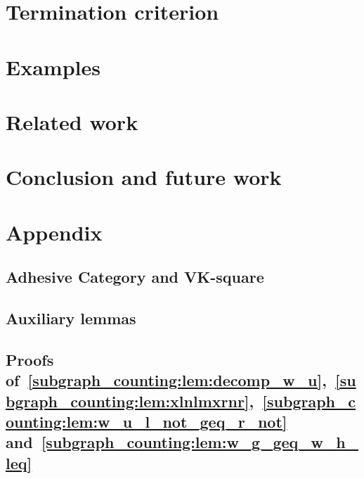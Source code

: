 \documentclass{report}
\begin{document}
 
  
\section{Termination criterion}
\label{subgraph_counting:sec:termination} 

 

\section{Examples} 
\label{subgraph_counting:sec:examples}


  
\section{Related work}
\label{subgraph_counting:sec:related_work} 


\section{Conclusion and future work}
\label{subgraph_counting:sec:conclusion} 


\section{Appendix}
\subsection*{Adhesive Category and VK-square}

\subsection*{Auxiliary lemmas}

\subsection*{Proofs of~\autoref{subgraph_counting:lem:decomp_w_u},~\autoref{subgraph_counting:lem:xlnlmxrnr},~\autoref{subgraph_counting:lem:w_u_l_not_geq_r_not} and~\autoref{subgraph_counting:lem:w_g_geq_w_h_leq}}
\label{subgraph_counting:sec:appendix:a}

\end{document}
